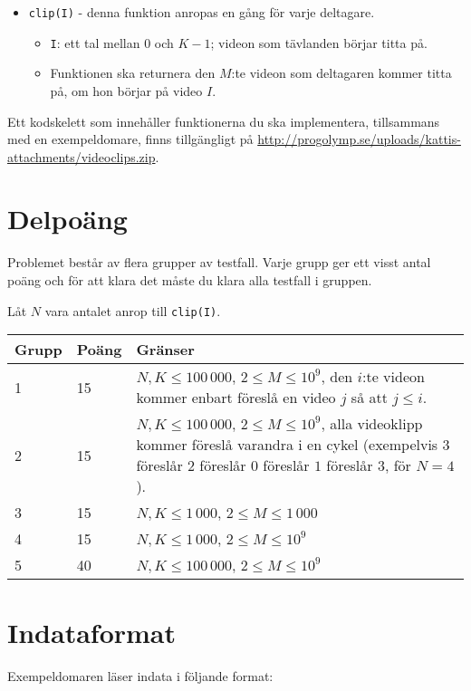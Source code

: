 \begin{itemize}
  \item \texttt{clip(I)} - denna funktion anropas en gång för varje deltagare.
  \begin{itemize}
    \item \texttt{I}: ett tal mellan $0$ och $K - 1$; videon som tävlanden börjar titta på.
		\item Funktionen ska returnera den $M$:te videon som deltagaren kommer titta på, om hon börjar på video $I$.
  \end{itemize}
\end{itemize}

Ett kodskelett som innehåller funktionerna du ska implementera, tillsammans med en exempeldomare, finns tillgängligt på
\url{http://progolymp.se/uploads/kattis-attachments/videoclips.zip}.

\section*{Delpoäng}
Problemet består av flera grupper av testfall. Varje grupp ger ett visst antal poäng och för att klara det måste du klara alla testfall i gruppen.

Låt $N$ vara antalet anrop till \texttt{clip(I)}.

\begin{tabular}{|l|l|p{7cm}|}
  \hline
  \textbf{Grupp} & \textbf{Poäng} & \textbf{Gränser} \\ \hline
  1 & 15 & $N, K \le 100\,000$, $2 \le M \le 10^9$, den $i$:te videon kommer enbart föreslå en video $j$ så att $j \le i$. \\ \hline
  2 & 15 & $N, K \le 100\,000$, $2 \le M \le 10^9$, alla videoklipp kommer föreslå varandra i en cykel (exempelvis $3$ föreslår $2$ föreslår $0$ föreslår $1$ föreslår $3$, för $N = 4$). \\ \hline
  3 & 15 & $N, K \le 1\,000$, $2 \le M \le 1\,000$ \\ \hline
  4 & 15 & $N, K \le 1\,000$, $2 \le M \le 10^9$ \\ \hline
  5 & 40 & $N, K \le 100\,000$, $2 \le M \le 10^9$ \\ \hline
\end{tabular}

\section*{Indataformat}
Exempeldomaren läser indata i följande format:

